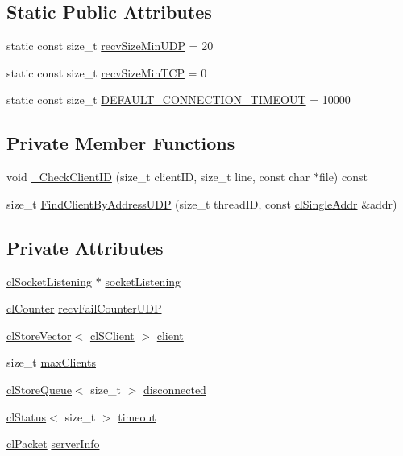 \subsection*{Static Public Attributes}
\begin{DoxyCompactItemize}
\item 
static const size\_\-t \hyperlink{classcl_server_state_ae6d8460b8b124c1ece70b94440cea634}{recvSizeMinUDP} = 20
\item 
static const size\_\-t \hyperlink{classcl_server_state_a6f718c1f7be5673a45d04df644f7ce5b}{recvSizeMinTCP} = 0
\item 
static const size\_\-t \hyperlink{classcl_server_state_aa61be479aa559af84ebad2a136c2173b}{DEFAULT\_\-CONNECTION\_\-TIMEOUT} = 10000
\end{DoxyCompactItemize}
\subsection*{Private Member Functions}
\begin{DoxyCompactItemize}
\item 
void \hyperlink{classcl_server_state_a81e2910f7c99cfc1ed515932dadc7df9}{\_\-CheckClientID} (size\_\-t clientID, size\_\-t line, const char $\ast$file) const 
\item 
size\_\-t \hyperlink{classcl_server_state_a6ff5552b881351ef18fc33df532c2ad6}{FindClientByAddressUDP} (size\_\-t threadID, const \hyperlink{classcl_single_addr}{clSingleAddr} \&addr)
\end{DoxyCompactItemize}
\subsection*{Private Attributes}
\begin{DoxyCompactItemize}
\item 
\hyperlink{classcl_socket_listening}{clSocketListening} $\ast$ \hyperlink{classcl_server_state_a5420d87b6c3e42c7ab033d00273ffe51}{socketListening}
\item 
\hyperlink{classcl_counter}{clCounter} \hyperlink{classcl_server_state_a375603ab73421b96cfe100570d86300d}{recvFailCounterUDP}
\item 
\hyperlink{classcl_store_vector}{clStoreVector}$<$ \hyperlink{classcl_s_client}{clSClient} $>$ \hyperlink{classcl_server_state_a4d04e7fec349fb69ac9d7d4278c7e915}{client}
\item 
size\_\-t \hyperlink{classcl_server_state_a78bea97e597f0122863a4ee259a24785}{maxClients}
\item 
\hyperlink{classcl_store_queue}{clStoreQueue}$<$ size\_\-t $>$ \hyperlink{classcl_server_state_a1928a46878962bc4d2c804bf21074319}{disconnected}
\item 
\hyperlink{classcl_status}{clStatus}$<$ size\_\-t $>$ \hyperlink{classcl_server_state_ad8a53992b7a622816eeb6b70fd4fec25}{timeout}
\item 
\hyperlink{classcl_packet}{clPacket} \hyperlink{classcl_server_state_a65f672655a8b980a21e84d939ad81841}{serverInfo}
\end{DoxyCompactItemize}


